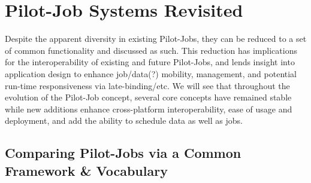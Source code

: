 \documentclass{sig-alternate}
\begin{document}



\section{Pilot-Job Systems Revisited}
Despite the apparent diversity in existing Pilot-Jobs,
they can be reduced to a set of common functionality and
discussed as such.  This reduction has implications
for the interoperability of existing and future Pilot-Jobs, and
lends insight into application design to enhance job/data(?)
mobility, management, and potential run-time responsiveness via
late-binding/etc.  We will see that throughout the evolution
of the Pilot-Job concept, several core concepts have remained stable
while new additions enhance cross-platform interoperability,
ease of usage and deployment, and add the ability to
schedule data as well as jobs. 




\subsection{Comparing Pilot-Jobs via a Common Framework \& Vocabulary}
\end{document}
